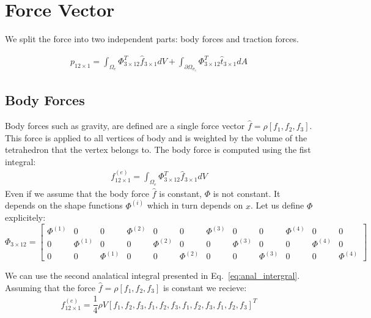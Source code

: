 \documentclass[en]{minipw} %
\begin{document}
\section{Force Vector}
We split the force into two independent parts: body forces and traction forces.

\begin{equation}
\begin{aligned}
p_{12 \times 1} = \int_{\Omega_{e}} \Phi_{3 \times 12}^{T} \hat{f}_{3 \times 1} dV + \int_{\partial \Omega_{\sigma_{e}}} \Phi_{3 \times 12}^{T} \hat{t}_{3 \times 1} dA
\end{aligned}
\end{equation}

\subsection{Body Forces}
Body forces such as gravity, are defined are a single force vector $\hat{f} = \rho[f_1, f_2, f_3]$. This force is applied to all vertices of body and is weighted by the volume of the tetrahedron that the vertex belongs to.
The body force is computed using the fist integral:
\begin{equation}
\begin{aligned}
f^{(e)}_{12 \times 1} = \int_{\Omega_{e}} \Phi_{3 \times 12}^{T} \hat{f}_{3 \times 1} dV
\end{aligned}
\end{equation}
Even if we assume that the body force $\hat{f}$ is constant, $\Phi$ is not constant. It depends on the shape functions $\Phi^{(i)}$ which in turn depends on $x$. Let us define $\Phi$ explicitely:
\begin{equation}
\label{eq:geometric_matrix}
\Phi_{3 \times 12} =
\begin{bmatrix}
\Phi^{(1)} & 0 & 0 & \Phi^{(2)} & 0 & 0 & \Phi^{(3)} & 0 & 0 & \Phi^{(4)} & 0 & 0 \\
0 & \Phi^{(1)} & 0 & 0 & \Phi^{(2)} & 0 & 0 & \Phi^{(3)} & 0 & 0 & \Phi^{(4)} & 0 \\
0 & 0 & \Phi^{(1)} & 0 & 0 & \Phi^{(2)} & 0 & 0 & \Phi^{(3)} & 0 & 0 & \Phi^{(4)} 
\end{bmatrix}
\end{equation}

We can use the second analatical integral presented in Eq.~\ref{eq:anal_intergral}. Assuming that the force $\hat{f} = \rho[f_1, f_2, f_3]$ is constant we recieve:
\begin{equation}
\begin{aligned}
f^{(e)}_{12 \times 1} = \dfrac{1}{4} \rho V [f_1, f_2, f_3, f_1, f_2, f_3, f_1, f_2, f_3,f_1, f_2, f_3]^{T} 
\end{aligned}
\end{equation}
\end{document}
